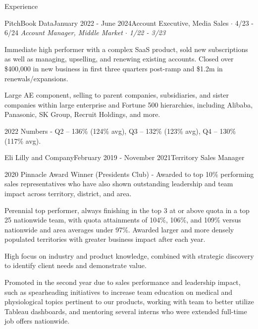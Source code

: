 \documentclass[
	11pt, %
]{resume} %
\begin{document}
\begin{rSection}{Experience}
\begin{rSubsection}{PitchBook Data}{January 2022 - June 2024\smallskip}{Account Executive, Media Sales $\cdot$ 4/23 - 6/24}{}
        \smallskip
        \smallskip
            \textit{Account Manager, Middle Market $\cdot$ 1/22 - 3/23}
        \smallskip
        \smallskip
		\item Immediate high performer with a complex SaaS product, sold new subscriptions as well as managing, upselling, and renewing existing accounts. Closed over \$400,000 in new business in first three quarters post-ramp and \$1.2m in renewals/expansions.
            \item Large AE component, selling to parent companies, subsidiaries, and sister companies within large enterprise and Fortune 500 hierarchies, including Alibaba, Panasonic, SK Group, Recruit Holdings, and more.
		\item 2022 Numbers - Q2 – 136\% (124\% avg), Q3 – 132\% (123\% avg), Q4 – 130\% (117\% avg).
            
	\end{rSubsection}


	\begin{rSubsection}{Eli Lilly and Company}{February 2019 - November 2021}{Territory Sales Manager}{}
		\item 2020 Pinnacle Award Winner (Presidents Club) - Awarded to top 10\% performing sales representatives who have also shown outstanding leadership and team impact across territory, district, and area.
		\item Perennial top performer, always finishing in the top 3 at or above quota in a top 25 nationwide team, with quota attainments of 104\%, 106\%, and 109\% versus \\nationwide and area averages under 97\%. Awarded larger and more densely populated territories with greater business impact after each year.

            \item High focus on industry and product knowledge, combined with strategic discovery to identify client needs and demonstrate value.
  
            \item Promoted in the second year due to sales performance and leadership impact, such as spearheading initiatives to increase team education on medical and physiological topics pertinent to our products, working with team to better utilize Tableau dashboards, and mentoring several interns who were extended full-time job offers nationwide.
            
	\end{rSubsection}


\end{rSection}
\end{document}
